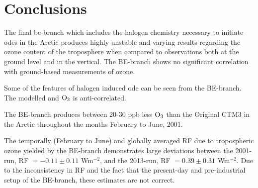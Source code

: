 \setcounter{chapter}{7}
\chapter{Conclusions}\label{Chap:conclusion}

The final \acrlong{be}-branch which includes the halogen chemistry necessary to initiate \acrlong{ode}s in the Arctic produces highly unstable and varying results regarding the ozone content of the troposphere when compared to observations both at the ground level and in the vertical. The BE-branch shows no significant correlation with ground-based measurements of ozone. 

\medskip

Some of the features of halogen induced \acrshort{ode} can be seen from the BE-branch. The modelled  and $\mathrm{O_3}$ is anti-correlated. 

\medskip

The BE-branch produces between 20-30 ppb less $\mathrm{O_3}$ than the Original CTM3 in the Arctic throughout the months February to June, 2001. 

\medskip

The temporally (February to June) and globally averaged RF due to tropospheric ozone yielded by the BE-branch demonstrates large deviations between the 2001-run, RF $=-0.11\pm0.11$ Wm$^{-2}$, and the 2013-run, RF $= 0.39\pm0.31$ Wm$^{-2}$. Due to the inconsistency in RF and the fact that the present-day and pre-industrial setup of the BE-branch, these estimates are not correct. 